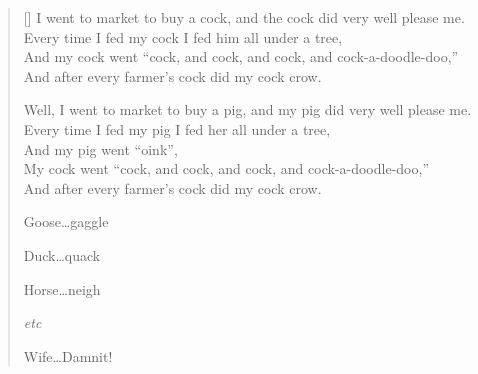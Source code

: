 \pagebreak
\settowidth{\versewidth}{I went to market to buy a cock, and the cock did very well please me.}
\begin{verse}[\versewidth]
I went to market to buy a cock, and the cock did very well please me.\\
Every time I fed my cock I fed him all under a tree,\\
And my cock went ``cock, and cock, and cock, and cock-a-doodle-doo,''\\
And after every farmer's cock did my cock crow.

Well, I went to market to buy a pig, and my pig did very well please me.\\
Every time I fed my pig I fed her all under a tree,\\
And my pig went ``oink'',\\
My cock went ``cock, and cock, and cock, and cock-a-doodle-doo,''\\
And after every farmer's cock did my cock crow.

Goose\dots gaggle

Duck\dots quack

Horse\dots neigh

\textit{etc}

Wife\dots Damnit!
\end{verse}
